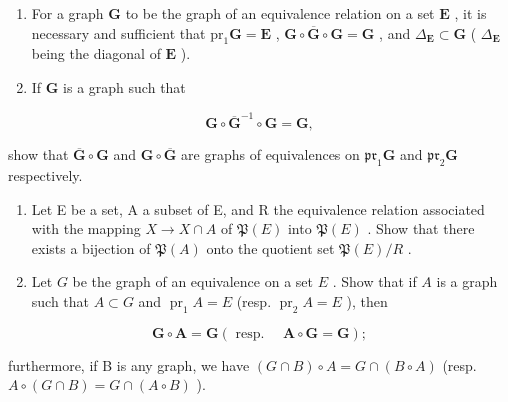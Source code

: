 \exercisegroup

\begin{enumerate}
\def\labelenumi{\arabic{enumi}.}
\item
  For a graph \(\mathbf{G}\) to be the graph of an equivalence relation on a set \(\mathbf{E}\) , it is necessary and sufficient that \(\mathrm{pr}_1\mathbf{G} = \mathbf{E}\) , \(\mathbf{G} \circ \overline{\mathbf{G}} \circ \mathbf{G} = \mathbf{G}\) , and \(\Delta_{\mathbf{E}} \subset \mathbf{G}\) ( \(\Delta_{\mathbf{E}}\) being the diagonal of \(\mathbf{E}\) ).
\item
  If \(\mathbf{G}\) is a graph such that
\end{enumerate}

\[
\mathbf {G} \circ \overline {{{{\mathbf {G}}}}} ^ {- 1} \circ \mathbf {G} = \mathbf {G},
\]

show that \(\overline{\mathbf{G}}\circ \mathbf{G}\) and \(\mathbf{G}\circ \overline{\mathbf{G}}\) are graphs of equivalences on \(\mathfrak{pr}_1\mathbf{G}\) and \(\mathfrak{pr}_2\mathbf{G}\) respectively.

\begin{enumerate}
\def\labelenumi{\arabic{enumi}.}
\setcounter{enumi}{2}
\item
  Let E be a set, A a subset of E, and R the equivalence relation associated with the mapping \(X \rightarrow X \cap A\) of \(\mathfrak{P}(E)\) into \(\mathfrak{P}(E)\) . Show that there exists a bijection of \(\mathfrak{P}(A)\) onto the quotient set \(\mathfrak{P}(E)/R\) .
\item
  Let \(G\) be the graph of an equivalence on a set \(E\) . Show that if \(A\) is a graph such that \(A \subset G\) and \(\operatorname{pr}_1 A = E\) (resp. \(\operatorname{pr}_2 A = E\) ), then
\end{enumerate}

\[
\mathbf {G} \circ \mathbf {A} = \mathbf {G} (\text { resp. } \quad \mathbf {A} \circ \mathbf {G} = \mathbf {G});
\]

furthermore, if B is any graph, we have \((G \cap B) \circ A = G \cap (B \circ A)\) (resp. \(A \circ (G \cap B) = G \cap (A \circ B)\) ).

